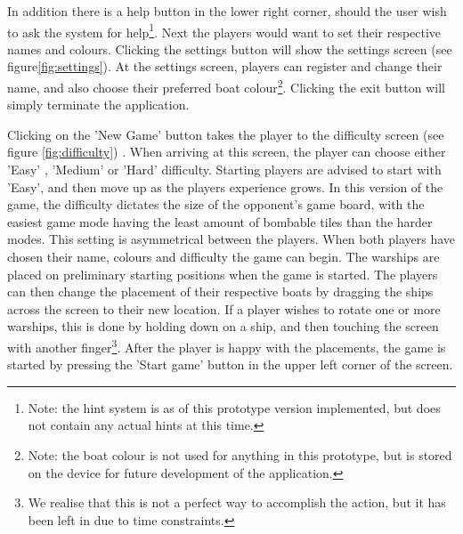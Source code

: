 In addition there is a help button in the lower right corner, should the user wish to ask the system for help\footnote{Note: the hint system is as of this prototype version implemented, but does not contain any actual hints at this time.}. 
Next the players would want to set their respective names and colours. Clicking the settings button will show the settings screen (see figure\ref{fig:settings}). At the settings screen, players can register and change their name, and also choose their preferred boat colour\footnote{Note: the boat colour is not used for anything in this prototype, but is stored on the device for future development of the application.}. 
Clicking the exit button will simply terminate the application. 

Clicking on the 'New Game' button takes the player to the difficulty screen (see figure \ref{fig:difficulty}) . When arriving at this screen, the player can choose either 'Easy' , 'Medium' or 'Hard' difficulty. Starting players are advised to start with 'Easy', and then move up as the players experience grows. 
In this version of the game, the difficulty dictates the size of the opponent's game board, with the easiest game mode having the least amount of bombable tiles than the harder modes. This setting is asymmetrical between the players.
\newpage
When both players have chosen their name, colours and difficulty the game can begin. 
The warships are placed on preliminary starting positions when the game is started. The players can then change the placement of their respective boats by dragging the ships across the screen to their new location. If a player wishes to rotate one or more warships, this is done by holding down on a ship, and then touching the screen with another finger\footnote{We realise that this is not a perfect way to accomplish the action, but it has been left in due to time constraints.}. After the player is happy with the placements, the game is started by pressing the 'Start game' button in the upper left corner of the screen.

